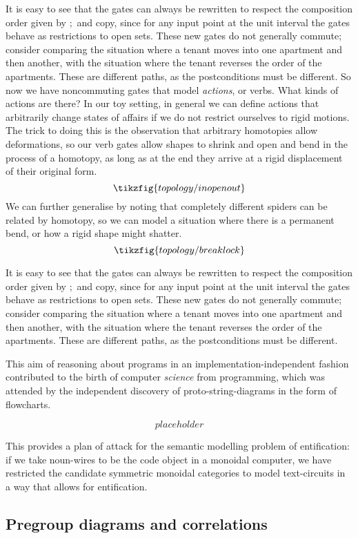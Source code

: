 It is easy to see that the gates can always be rewritten to respect the composition order given by $\mathbf{;}$ and copy, since for any input point at the unit interval the gates behave as restrictions to open sets. These new gates do not generally commute; consider comparing the situation where a tenant moves into one apartment and then another, with the situation where the tenant reverses the order of the apartments. These are different paths, as the postconditions must be different. So now we have noncommuting gates that model \emph{actions}, or verbs. What kinds of actions are there? In our toy setting, in general we can define actions that arbitrarily change states of affairs if we do not restrict ourselves to rigid motions. The trick to doing this is the observation that arbitrary homotopies allow deformations, so our verb gates allow shapes to shrink and open and bend in the process of a homotopy, as long as at the end they arrive at a rigid displacement of their original form.
\[\tikzfig{topology/inopenout}\]
We can further generalise by noting that completely different spiders can be related by homotopy, so we can model a situation where there is a permanent bend, or how a rigid shape might shatter.
\[\tikzfig{topology/breaklock}\]


It is easy to see that the gates can always be rewritten to respect the composition order given by $\mathbf{;}$ and copy, since for any input point at the unit interval the gates behave as restrictions to open sets. These new gates do not generally commute; consider comparing the situation where a tenant moves into one apartment and then another, with the situation where the tenant reverses the order of the apartments. These are different paths, as the postconditions must be different. 


This aim of reasoning about programs in an implementation-independent fashion contributed to the birth of computer \emph{science} from programming, which was attended by the independent discovery of proto-string-diagrams in the form of flowcharts.

\[placeholder\]


This provides a plan of attack for the semantic modelling problem of entification: if we take noun-wires to be the code object in a monoidal computer, we have restricted the candidate symmetric monoidal categories to model text-circuits in a way that allows for entification.


\subsection{Pregroup diagrams and correlations}

